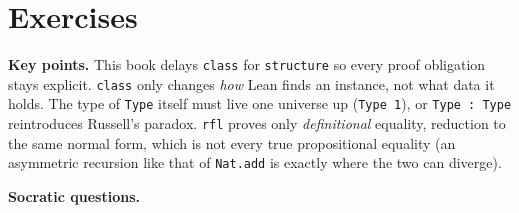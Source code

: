 \section{Exercises}\label{sec:05-rigor-check:05-exercises:1}

\textbf{Key points.} This book delays \texttt{class} for \texttt{structure} so every proof obligation stays explicit. \texttt{class} only changes \emph{how} Lean finds an instance, not what data it holds. The type of \texttt{Type} itself must live one universe up (\texttt{Type 1}), or \texttt{Type : Type} reintroduces Russell's paradox. \texttt{rfl} proves only \emph{definitional} equality, reduction to the same normal form, which is not every true propositional equality (an asymmetric recursion like that of \texttt{Nat.add} is exactly where the two can diverge).

\textbf{Socratic questions.}


